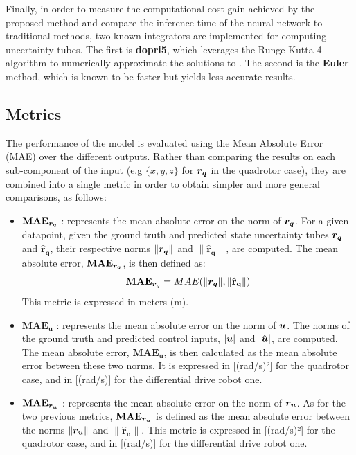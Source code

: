Finally, in order to measure the computational cost gain achieved by the proposed method and compare the inference time of the neural network to traditional methods, two known  integrators are implemented for computing uncertainty tubes.
The first is \textbf{dopri5}, which leverages the Runge Kutta-4 algorithm to numerically approximate the solutions to . 
The second is the \textbf{Euler} method, which is known to be faster but yields less accurate results.

\subsection{Metrics}\label{sec:metric}

The performance of the model is evaluated using the Mean Absolute Error (MAE) over the different outputs. 
Rather than comparing the results on each sub-component of the input (e.g $\{x, y, z\}$ for $\boldsymbol{r_q}$ in the quadrotor case), they are combined into a single metric in order to obtain simpler and more general comparisons, as follows:
\begin{itemize}
    \item $\mathbf{MAE_{\boldsymbol{r_q}}}$ : represents the mean absolute error on the norm of $\boldsymbol{r_q}$. 
    For a given datapoint, given the ground truth and predicted state uncertainty tubes $\boldsymbol{r_q}$ and $\mathbf{\hat{r}_q}$, their respective norms $\|\boldsymbol{r_q}\|$ and $\|\mathbf{\hat{r}_q}\|$, are computed. 
    The mean absolute error, $\mathbf{MAE_{\boldsymbol{r_q}}}$, is then defined as:
    \begin{equation}\label{eq:MAE rq}
        \mathbf{MAE_{\boldsymbol{r_q}}} = MAE(\|\boldsymbol{r_q}\|, \|\mathbf{\hat{r}_q}\|)
    \end{equation}
    This metric is expressed in meters (m).
    \item $\mathbf{MAE_{u}}$ : represents the mean absolute error on the norm of $\boldsymbol{u}$. 
    The norms of the ground truth and predicted control inputs, $|\boldsymbol{u}|$ and $|\hat{\boldsymbol{u}}|$, are computed. 
    The mean absolute error, $\mathbf{MAE_{u}}$, is then calculated as the mean absolute error between these two norms. 
    It is expressed in [(rad/s)²] for the quadrotor case, and in [(rad/s)] for the differential drive robot one.
    \item $\mathbf{MAE_{\boldsymbol{r_u}}}$ : represents the mean absolute error on the norm of $\boldsymbol{r_u}$. 
    As for the two previous metrics, $\mathbf{MAE_{\boldsymbol{r_u}}}$ is defined as the mean absolute error between the norms $\|\boldsymbol{r_u}\|$ and $\|\mathbf{\hat{r}_u}\|$. 
    This metric is expressed in [(rad/s)²] for the quadrotor case, and in [(rad/s)] for the differential drive robot one.
\end{itemize}

